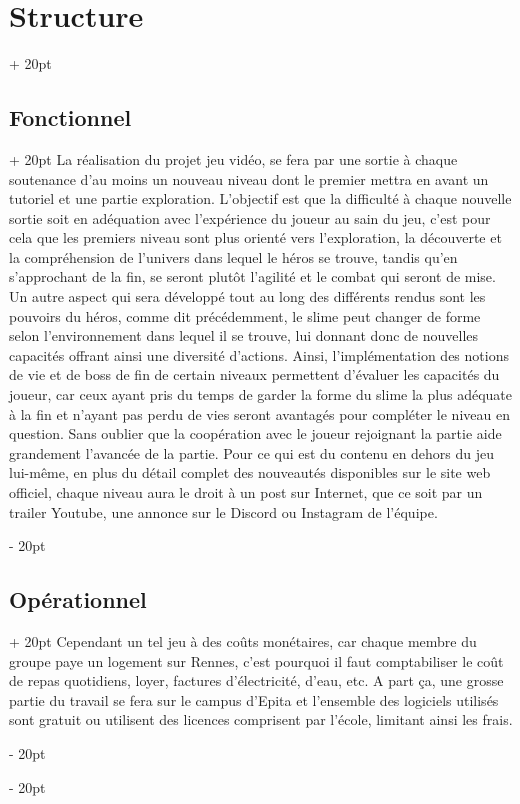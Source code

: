 \documentclass[a4paper, 12pt, twoside]{article}
\newcommand{\ind}[1][20pt]{\advance\leftskip + #1}
\newcommand{\deind}[1][20pt]{\advance\leftskip - #1}
\newenvironment{indt}[2][20pt]{#2 \par \ind[#1]}{\par \deind} %
\begin{document}
\begin{indt}{\section{Structure}}
        \begin{indt}{\subsection{Fonctionnel}}
            La réalisation du projet jeu vidéo, se fera par une sortie à chaque soutenance d'au moins un nouveau niveau dont le premier mettra en avant un tutoriel et une partie exploration. L'objectif est que la difficulté à chaque nouvelle sortie soit en adéquation avec l'expérience du joueur au sain du jeu, c'est pour cela que les premiers niveau sont plus orienté vers l'exploration, la découverte et la compréhension de l'univers dans lequel le héros se trouve, tandis qu'en s'approchant de la fin, se seront plutôt l'agilité et le combat qui seront de mise. Un autre aspect qui sera développé tout au long des différents rendus sont les pouvoirs du héros, comme dit précédemment, le slime peut changer de forme selon l'environnement dans lequel il se trouve, lui donnant donc de nouvelles capacités offrant ainsi une diversité d'actions. Ainsi, l'implémentation des notions de vie et de boss de fin de certain niveaux permettent d'évaluer les capacités du joueur, car ceux ayant pris du temps de garder la forme du slime la plus adéquate à la fin et n'ayant pas perdu de vies seront avantagés pour compléter le niveau en question. Sans oublier que la coopération avec le joueur rejoignant la partie aide grandement l'avancée de la partie. Pour ce qui est du contenu en dehors du jeu lui-même, en plus du détail complet des nouveautés disponibles sur le site web officiel, chaque niveau aura le droit à un post sur Internet, que ce soit par un trailer Youtube, une annonce sur le Discord ou Instagram de l'équipe.
        \end{indt} 

        \begin{indt}{\subsection{Opérationnel}}
            Cependant un tel jeu à des coûts monétaires, car chaque membre du groupe paye un logement sur Rennes, c'est pourquoi il faut comptabiliser le coût de repas quotidiens, loyer, factures d'électricité, d'eau, etc. A part ça, une grosse partie du travail se fera sur le campus d'Epita et l'ensemble des logiciels utilisés sont gratuit ou utilisent des licences comprisent par l'école, limitant ainsi les frais.
        \end{indt} 
    \end{indt}
\end{document}
